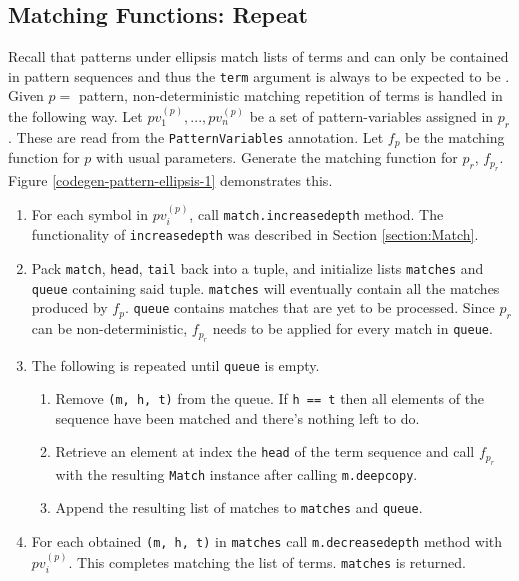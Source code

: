 \subsection{Matching Functions: Repeat}
\label{section:pattern-repeat}
Recall that patterns under ellipsis match lists of terms and can only be contained in pattern sequences and thus the \texttt{term} argument is always to be expected to be \newline \PatternSequence. Given $p=$ \PatternRepeat \space pattern, non-deterministic matching repetition of terms is handled in the following way. Let $pv_1^{(p)}, ..., pv_n^{(p)}$ be a set of pattern-variables assigned in $p_r$. These are read from the \newline \texttt{PatternVariables} annotation.  Let $f_p$ be the matching function for $p$ with usual parameters. Generate the matching function for $p_r$, $f_{p_r}$. Figure \ref{codegen-pattern-ellipsis-1} demonstrates this.

\begin{enumerate}
\item
For each symbol in $pv_i^{(p)}$, call \texttt{match.increasedepth} method. The functionality of \texttt{increasedepth} was described in Section \ref{section:Match}.
\item
Pack \texttt{match}, \texttt{head}, \texttt{tail} back into a tuple, and initialize lists \texttt{matches} and \texttt{queue} containing said tuple. \texttt{matches} will eventually contain all the matches produced by $f_p$. \texttt{queue} contains matches that are yet to be processed. Since $p_r$ can be non-deterministic, $f_{p_r}$ needs to be applied for every match in \texttt{queue}.
\item The following is repeated until \texttt{queue} is empty.
	\begin{enumerate}
	\item
	Remove \texttt{(m, h, t)} from the queue. If \texttt{h == t} then all elements of the sequence have been matched and there's nothing left to do.
	\item
	Retrieve an element at index the \texttt{head} of the term sequence and call $f_{p_r}$ with the resulting \texttt{Match} instance after calling \texttt{m.deepcopy}.
	\item Append the resulting list of matches to \texttt{matches} and \texttt{queue}.
	\end{enumerate}

\item
For each obtained \texttt{(m, h, t)} in \texttt{matches} call \texttt{m.decreasedepth} method with $pv_i^{(p)}$. This completes matching the list of terms. \texttt{matches} is returned.
\end{enumerate}

